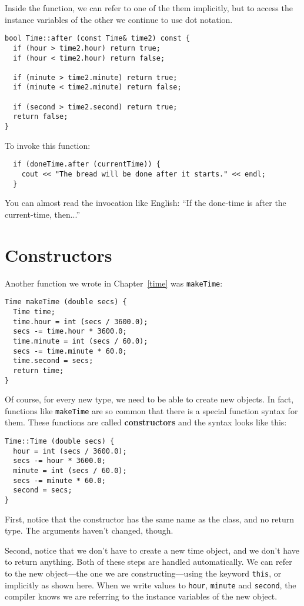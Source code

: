 {Inside the function, we can refer to one of the them implicitly,
but to access the instance variables of the other we continue
to use dot notation.

\begin{verbatim}
bool Time::after (const Time& time2) const {
  if (hour > time2.hour) return true;
  if (hour < time2.hour) return false;

  if (minute > time2.minute) return true;
  if (minute < time2.minute) return false;

  if (second > time2.second) return true;
  return false;
}
\end{verbatim}
%
To invoke this function:

\begin{verbatim}
  if (doneTime.after (currentTime)) {
    cout << "The bread will be done after it starts." << endl;
  }
\end{verbatim}
%
You can almost read the invocation like English: ``If the
done-time is after the current-time, then...''

\section{Constructors}

Another function we wrote in Chapter~\ref{time} was
{\tt makeTime}:

\begin{verbatim}
Time makeTime (double secs) {
  Time time;
  time.hour = int (secs / 3600.0);
  secs -= time.hour * 3600.0;
  time.minute = int (secs / 60.0);
  secs -= time.minute * 60.0;
  time.second = secs;
  return time;
}
\end{verbatim}
%
Of course, for every new type, we need to be able to create
new objects.  In fact, functions like {\tt makeTime} are so
common that there is a special function syntax for them.  These
functions are called {\bf constructors} and the syntax looks
like this:

\begin{verbatim}
Time::Time (double secs) {
  hour = int (secs / 3600.0);
  secs -= hour * 3600.0;
  minute = int (secs / 60.0);
  secs -= minute * 60.0;
  second = secs;
}
\end{verbatim}
%
First, notice that the constructor has the same name as the
class, and no return type.  The arguments haven't changed, though.

Second, notice that we don't have to create a new time object,
and we don't have to return anything.  Both of these steps are
handled automatically.  We can refer to the new object---the one
we are constructing---using the keyword {\tt this}, or implicitly
as shown here.  When we write values to {\tt hour}, {\tt minute}
and {\tt second}, the compiler knows we are referring to the instance
variables of the new object.

}
